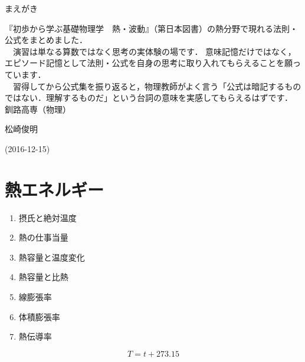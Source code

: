 \documentclass[10pt]{jarticle}
\begin{document}
\addtocounter{page}{-1}
\thispagestyle{empty}

まえがき\\

{\scriptsize
『初歩から学ぶ基礎物理学　熱・波動』（第日本図書）の熱分野で現れる法則・公式をまとめました．\\

　演習は単なる算数ではなく思考の実体験の場です．
意味記憶だけではなく，エピソード記憶として法則・公式を自身の思考に取り入れてもらえることを願っています．\\

　習得してから公式集を振り返ると，物理教師がよく言う「公式は暗記するものではない．理解するものだ」という台詞の意味を実感してもらえるはずです．\\



\hfill
釧路高専（物理）

\hfill
松崎俊明

\vfill
\hfill
(2016-12-15)
}




\addtocounter{page}{-1}
\thispagestyle{empty}
\tableofcontents



\newpage
\addtocounter{page}{-1}
\thispagestyle{empty}
\section{熱エネルギー}


\begin{enumerate}
\small
\itemsep-4mm
\item 摂氏と絶対温度\\
\item 熱の仕事当量\\
\item 熱容量と温度変化\\
\item 熱容量と比熱\\
\item 線膨張率\\
\item 体積膨張率\\
\item 熱伝導率
\end{enumerate}


\newpage
\[
	T = t + 273.15
\]
\end{document}
